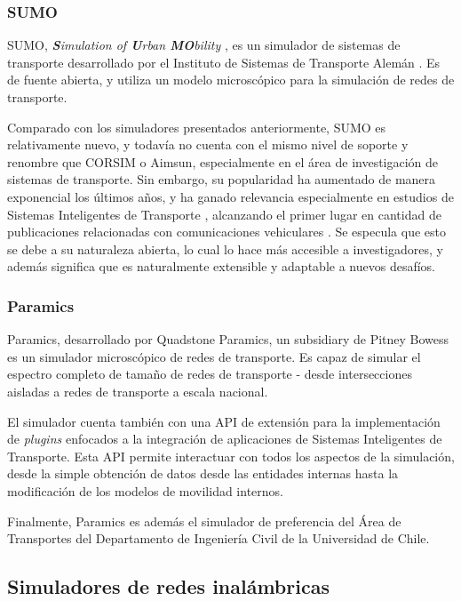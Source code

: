 \subsubsection{SUMO}

SUMO, \emph{\textbf{S}imulation of \textbf{U}rban \textbf{MO}bility} \autocite{sumo}, es un simulador de sistemas de transporte desarrollado por el Instituto de Sistemas de Transporte Alemán \autocite{dlr}. 
Es de fuente abierta, y utiliza un modelo microscópico para la simulación de redes de transporte.

Comparado con los simuladores presentados anteriormente, SUMO es relativamente nuevo, y todavía no cuenta con el mismo nivel de soporte y renombre que CORSIM o Aimsun, especialmente en el área de investigación de sistemas de transporte. Sin embargo, su popularidad ha aumentado de manera exponencial los últimos años, y ha ganado relevancia especialmente en estudios de Sistemas Inteligentes de Transporte \autocite{sumo-popularity}, alcanzando el primer lugar en cantidad de publicaciones relacionadas con comunicaciones vehiculares \autocite{sumo-popularity2}. Se especula que esto se debe a su naturaleza abierta, lo cual lo hace más accesible a investigadores, y además significa que es naturalmente extensible y adaptable a nuevos desafíos.

\subsubsection{Paramics}

Paramics, desarrollado por Quadstone Paramics, un subsidiary de Pitney Bowess \autocite{paramics} es un simulador microscópico de redes de transporte. Es capaz de simular el espectro completo de tamaño de redes de transporte - desde intersecciones aisladas a redes de transporte a escala nacional.

El simulador cuenta también con una API de extensión para la implementación de \emph{plugins} enfocados a la integración de aplicaciones de Sistemas Inteligentes de Transporte. Esta API permite interactuar con todos los aspectos de la simulación, desde la simple obtención de datos desde las entidades internas hasta la modificación de los modelos de movilidad internos.

Finalmente, Paramics es además el simulador de preferencia del Área de Transportes del Departamento de Ingeniería Civil de la Universidad de Chile.

\subsection{Simuladores de redes inalámbricas}

